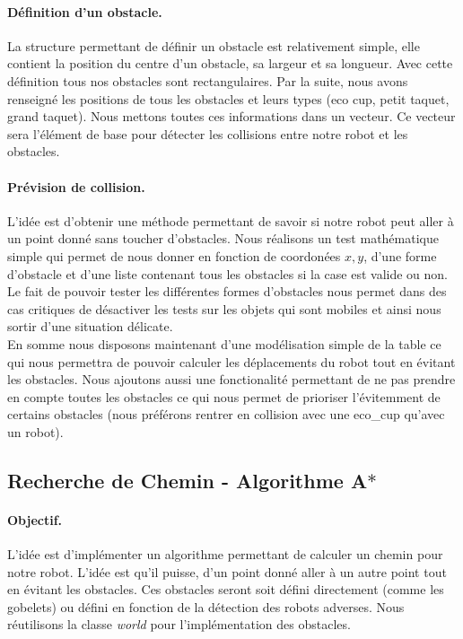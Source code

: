 \documentclass[a4paper,10pt]{report}
\begin{document}
\begin{spacing}{1.5}
\paragraph{Définition d'un obstacle.} La structure permettant de définir un
obstacle est relativement simple, elle contient la position du centre d'un
obstacle, sa largeur et sa longueur. Avec cette définition tous nos obstacles
sont rectangulaires. Par la suite, nous avons renseigné les positions de tous
les obstacles et leurs types (eco cup, petit taquet, grand taquet). Nous mettons
toutes ces informations dans un vecteur. Ce vecteur sera l'élément de base pour
détecter les collisions entre notre robot et les obstacles.

\paragraph{Prévision de collision.} L'idée est d'obtenir une méthode permettant
de savoir si notre robot peut aller à un point donné sans toucher d'obstacles.
Nous réalisons un test mathématique simple qui permet de nous donner en fonction
de coordonées $x,y$, d'une forme d'obstacle et d'une liste contenant tous les
obstacles si la case est valide ou non. Le fait de pouvoir tester les
différentes formes d'obstacles nous permet dans des cas critiques de désactiver
les tests sur les objets qui sont mobiles et ainsi nous sortir d'une situation
délicate. \\

\indent En somme nous disposons maintenant d'une modélisation simple de la table ce qui
nous permettra de pouvoir calculer les déplacements du robot tout en évitant les
obstacles. Nous ajoutons aussi une fonctionalité permettant de ne pas prendre en
compte toutes les obstacles ce qui nous permet de prioriser l'évitemment de
certains obstacles (nous préférons rentrer en collision avec une eco\_cup
qu'avec un robot).

\subsection{Recherche de Chemin - Algorithme A$\ast$}
\paragraph{Objectif.} L'idée est d'implémenter un algorithme permettant de
calculer un chemin pour notre robot. L'idée est qu'il puisse, d'un point donné
aller à un autre point tout en évitant les obstacles. Ces obstacles seront soit
défini directement (comme les gobelets) ou défini en fonction de la détection
des robots adverses. Nous réutilisons la classe \textit{world} pour
l'implémentation des obstacles.

\end{spacing}
\end{document}

